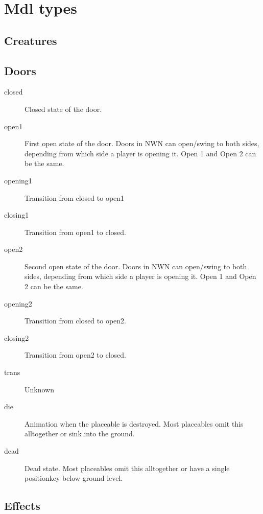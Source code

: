 \section{Mdl types}

\subsection{Creatures}

\subsection{Doors}
\begin{description}
    \item[closed] Closed state of the door.
    \item[open1] First open state of the door. Doors in NWN can open/swing to both sides, depending from which side a player is opening it. Open 1 and Open 2 can be the same.
    \item[opening1] Transition from closed to open1
    \item[closing1] Transition from open1 to closed.
    \item[open2] Second open state of the door. Doors in NWN can open/swing to both sides, depending from which side a player is opening it. Open 1 and Open 2 can be the same.
    \item[opening2] Transition from closed to open2.
    \item[closing2] Transition from open2 to closed.
    \item[trans] Unknown
    \item[die] Animation when the placeable is destroyed. Most placeables omit this alltogether or sink into the ground.
    \item[dead] Dead state. Most placeables omit this alltogether or have a single positionkey below ground level.
\end{description}

\subsection{Effects}

